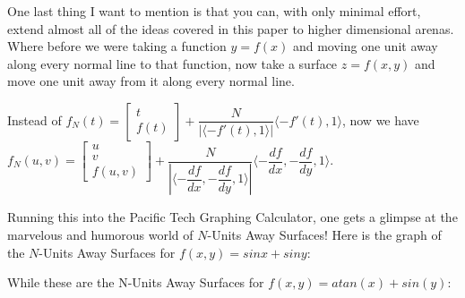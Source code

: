 One last thing I want to mention is that you can, with only minimal effort, extend almost all of the ideas covered in this paper to higher dimensional arenas. Where before we were taking a function $y = f(x)$ and moving one unit away along every normal line to that function, now take a surface $z = f(x, y)$ and move one unit away from it along every normal line.

\renewcommand\bvec{\langle -f'(t), 1 \rangle}
\newcommand\IIIdvec{\langle -\dfrac{df}{dx}, -\dfrac{df}{dy}, 1 \rangle}

Instead of $f_N(t) =
\begin{bmatrix}
  t \\
  f(t)
\end{bmatrix} + \dfrac{ N }{ |\bvec| } \bvec $, now we have $ f_N(u, v) =
\begin{bmatrix}
  u \\
  v \\
  f(u, v)
\end{bmatrix} + \allowbreak \dfrac{ N }{ |\IIIdvec| } \allowbreak \IIIdvec $.

Running this into the Pacific Tech Graphing Calculator, one gets a glimpse at the marvelous and humorous world of $N$-Units Away Surfaces! Here is the graph of the $N$-Units Away Surfaces for $f(x, y) = sinx + siny$:

\figuresI

While these are the N-Units Away Surfaces for $f(x, y) = atan(x) + sin(y)$:

\figuresII
